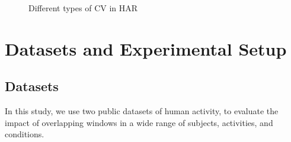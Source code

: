 \documentclass[sensors,article,submit,moreauthors,pdftex]{Definitions/mdpi}
\begin{document}
\begin{figure}[htp]
  \centering
  \quad
   \caption{Different types of CV in HAR}
    \label{fig:CVs}
\end{figure}




\section{Datasets and Experimental Setup} \label{sec:experiment setting}
\subsection{Datasets} \label{sec:dataset}
In this study, we use two public datasets of human activity, to evaluate the impact of overlapping windows in a wide range of subjects, activities, and conditions. 
\end{document}
